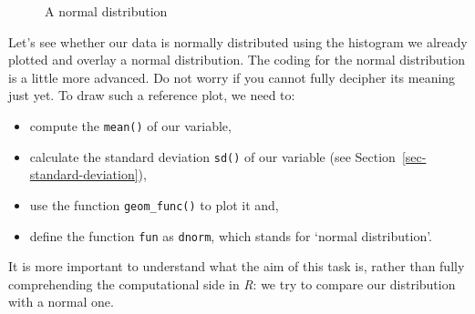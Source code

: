 \documentclass[
  letterpaper,
  DIV=11,
  numbers=noendperiod]{scrreprt}
\begin{document}
\begin{figure}


\caption{\label{fig-normal-distribution}A normal distribution}

\end{figure}%

Let's see whether our data is normally distributed using the histogram
we already plotted and overlay a normal distribution. The coding for the
normal distribution is a little more advanced. Do not worry if you
cannot fully decipher its meaning just yet. To draw such a reference
plot, we need to:

\begin{itemize}
\item
  compute the \texttt{mean()} of our variable,
\item
  calculate the standard deviation \texttt{sd()} of our variable (see
  Section~\ref{sec-standard-deviation}),
\item
  use the function \texttt{geom\_func()} to plot it and,
\item
  define the function \texttt{fun} as \texttt{dnorm}, which stands for
  `normal distribution'.
\end{itemize}

It is more important to understand what the aim of this task is, rather
than fully comprehending the computational side in \emph{R}: we try to
compare our distribution with a normal one.
\end{document}
